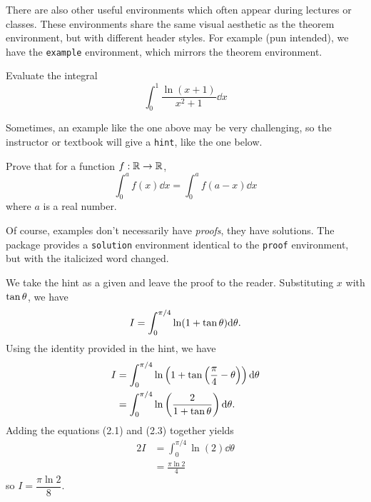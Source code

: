 \documentclass[11pt]{article}
\begin{document}
There are also other useful environments which often appear during lectures or classes. These environments share the same visual aesthetic as the theorem environment, but with different header styles. For example (pun intended), we have the \verb|example| environment, which mirrors the theorem environment.
\begin{example}[2005 Putnam A5]
	Evaluate the integral
	\[\int_0^1 \frac{\ln(x+1)}{x^2+1} \dd x\]
\end{example}
Sometimes, an example like the one above may be very challenging, so the instructor or textbook will give a \verb|hint|, like the one below.
\begin{hint}
	Prove that for a function $f: \mathbb{R} \to \mathbb{R}$,
	\[\int_0^a f(x) \dd x = \int_0^a f(a-x) \dd x\]
	where $a$ is a real number.
\end{hint}
Of course, examples don't necessarily have \textit{proofs}, they have solutions. The package provides a \verb|solution| environment identical to the \verb|proof| environment, but with the italicized word changed.
\begin{solution}
	We take the hint as a given and leave the proof to the reader. Substituting $x$ with $\tan\theta$, we have
	\begin{equation}
		I = \int_0^{\pi/4} \ln(1+\tan\theta)\dd\theta.
	\end{equation}
	Using the identity provided in the hint, we have
	\begin{align}
		I &= \int_0^{\pi/4} \ln\left(1+\tan\left(\frac{\pi}{4}-\theta\right)\right)	\dd\theta \\
		&= \int_0^{\pi/4} \ln\left(\frac{2}{1+\tan\theta}\right)\dd\theta.
	\end{align}
	Adding the equations (2.1) and (2.3) together yields
	\begin{align}
		2I &= \int_0^{\pi/4} \ln(2)\dd\theta \\
		&= \frac{\pi\ln2}{4}
	\end{align}
	so $I = \boxed{\dfrac{\pi\ln2}{8}}$.
\end{solution}
\end{document}
